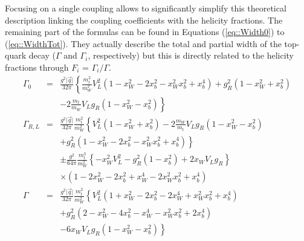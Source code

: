 Focusing on a single coupling allows to significantly simplify this theoretical description linking the coupling coefficients with the helicity fractions. The remaining part of the formulas can be found in Equations (\ref{eq::Width0}) to (\ref{eq::WidthTot}). They actually describe the total and partial width of the top-quark decay ($\Gamma$ and $\Gamma_i$, respectively) but this is directly related to the helicity fractions through $F_i$ = $\Gamma_i/\Gamma$.
\begin{eqnarray}
  \Gamma_{0}   & = & \frac{g^{2} \vert \vec{q} \vert}{32 \pi} \left\lbrace \frac{m_{t}^{2}}{m_{W}^{2}} V_{L}^{2} (1 - x_{W}^{2} - 2x_{b}^{2} -x_{W}^{2} x_{b}^{2} + x_{b}^{4}) + g_{R}^{2} (1 - x_{W}^{2} + x_{b}^{2}) \right. \nonumber \\
               &   & \left. - 2 \frac{m_{t}}{m_{W}} V_{L}g_{R} (1- x_{W}^{2} - x_{b}^{2}) \right\rbrace  \label{eq::Width0}\\
  \Gamma_{R,L} & = & \frac{g^{2} \vert \vec{q} \vert}{32 \pi} \frac{m_{t}^{2}}{m_{W}^{2}} \left\lbrace V_{L}^{2} (1 - x_{W}^{2} + x_{b}^{2}) - 2 \frac{m_W}{m_t} V_{L}g_{R} (1- x_{W}^{2} - x_{b}^{2}) \right. \nonumber \\
               &   & \left. + g_{R}^{2} (1 - x_{W}^{2} - 2x_{b}^{2} -x_{W}^{2} x_{b}^{2} + x_{b}^{4}) \right\rbrace \nonumber \\
               &   & \pm \frac{g^{2}}{64 \pi} \frac{m_{t}^{3}}{m_{W}^{2}} \left\lbrace -x_{W}^{2} V_{L}^{2} - g_{R}^{2} (1-x_{b}^{2}) + 2 x_{W} V_{L}g_{R} \right\rbrace \nonumber \\
               &   & \times (1-2x_{W}^{2} - 2x_{b}^{2} + x_{W}^{4} - 2x_{W}^{2} x_{b}^{2} + x_{b}^{4}) \label{eq::WidthRL} \\
  \Gamma       & = & \frac{g^{2} \vert \vec{q} \vert}{32 \pi} \frac{m_{t}^{2}}{m_{W}^{2}} \left\lbrace V_{L}^{2} (1 + x_{W}^{2} - 2x_{b}^{2} - 2 x_{W}^{4} + x_{W}^{2} x_{b}^{2} + x_{b}^{4}) \right. \nonumber \\
               &   & + g_{R}^{2} \left( 2 - x_{W}^{2} - 4 x_{b}^{2} - x_{W}^{4} - x_{W}^{2} x_{b}^{2} + 2 x_{b}^{4} \right) \nonumber \\
               &   & \left. - 6 x_{W} V_{L}g_{R} (1 - x_{W}^{2} - x_{b}^{2}) \right\rbrace \label{eq::WidthTot}
\end{eqnarray}
